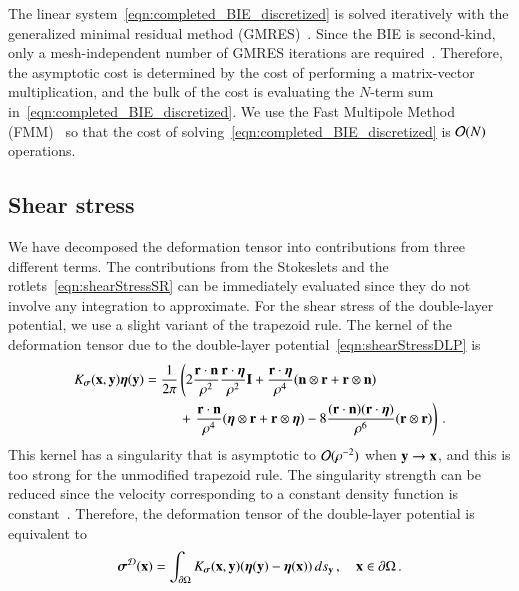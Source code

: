 \documentclass[preprint, 10pt]{elsarticle}
\begin{document}
The linear system~\eqref{eqn:completed_BIE_discretized} is solved
iteratively with the generalized minimal residual method
(GMRES)~\cite{saa-sch1986}.  Since the BIE is second-kind, only a
mesh-independent number of GMRES iterations are
required~\cite{cam-ips-kel-mey-xue1996}.  Therefore, the asymptotic cost
is determined by the cost of performing a matrix-vector multiplication,
and the bulk of the cost is evaluating the $N$-term sum
in~\eqref{eqn:completed_BIE_discretized}. We use the Fast Multipole
Method (FMM)~\cite{gre-rok1987, gre-gre-may1992} so that the cost of
solving~\eqref{eqn:completed_BIE_discretized} is ${\mathcal{O}}(N)$ operations.


\subsection{Shear stress}
\label{sec:shearStress}
We have decomposed the deformation tensor into contributions from three
different terms.  The contributions from the Stokeslets and the
rotlets~\eqref{eqn:shearStressSR} can be immediately evaluated since
they do not involve any integration to approximate.  For the shear
stress of the double-layer potential, we use a slight variant of the
trapezoid rule. The kernel of the deformation tensor due to the
double-layer potential~\eqref{eqn:shearStressDLP} is 
\begin{equation}
\begin{aligned}
  K_{\boldsymbol\sigma}({\mathbf{x}},{\mathbf{y}}){\boldsymbol\eta}({\mathbf{y}}) &= \frac{1}{2\pi} \left(
    2\frac{{\mathbf{r}} \cdot {\mathbf{n}}}{\rho^2} \frac{{\mathbf{r}} \cdot {\boldsymbol\eta}}{\rho^2} {\mathbf{I}} + 
    \frac{{\mathbf{r}} \cdot {\boldsymbol\eta}}{\rho^4} ({\mathbf{n}} \otimes {\mathbf{r}} + {\mathbf{r}} \otimes {\mathbf{n}})
    \right. \\ & \hspace{25pt}+ \left.
    \frac{{\mathbf{r}} \cdot {\mathbf{n}}}{\rho^4} ({\boldsymbol\eta} \otimes {\mathbf{r}} + {\mathbf{r}} \otimes {\boldsymbol\eta}) - 
    8\frac{({\mathbf{r}} \cdot {\mathbf{n}})({\mathbf{r}} \cdot {\boldsymbol\eta})}{\rho^6}({\mathbf{r}} \otimes {\mathbf{r}})
  \right) \, .
\end{aligned}
\end{equation}
This kernel has a singularity that is asymptotic to ${\mathcal{O}}(\rho^{-2})$
when ${\mathbf{y}} \rightarrow {\mathbf{x}}$, and this is too strong for the unmodified
trapezoid rule.  The singularity strength can be reduced since the
velocity corresponding to a constant density function is
constant~\cite{poz1992}.  Therefore, the deformation tensor of the
double-layer potential is equivalent to
\begin{align}
  {\boldsymbol\sigma}^{{\mathcal{D}}}({\mathbf{x}}) = \int_{{\partial}\Omega}K_{\boldsymbol\sigma}({\mathbf{x}},{\mathbf{y}})
      ({\boldsymbol\eta}({\mathbf{y}}) - {\boldsymbol\eta}({\mathbf{x}})) \, ds_{{\mathbf{y}}}\, , \quad {\mathbf{x}} \in {\partial}\Omega \, .
\end{align}
\end{document}
